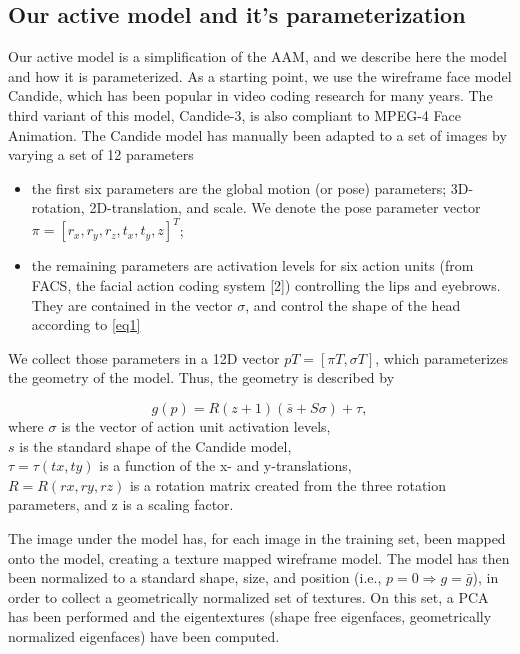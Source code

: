 \documentclass[12pt]{spieman}
\begin{document}
\begin{spacing}{2}   

\section{Our active model and it’s parameterization}
\label{sect:intro}  %
Our active model is a simplification of the AAM, and we describe here the model and how it is parameterized. As a starting point, we use the wireframe face model Candide, which has been popular in video coding research for many years. The third variant of this model, Candide-3, is also compliant to MPEG-4 Face Animation. The Candide model has manually been adapted to a set of images by varying a set of 12 parameters
\begin{itemize}
    \sloppy
    \item the first six parameters are the global motion (or pose) parameters; 3D-rotation, 2D-translation, and scale. We denote the pose parameter vector $\pi = [r_x ,r_y ,r_z ,t_x ,t_y ,z]^T$;
    \sloppy
    \item the remaining parameters are activation levels for six action units (from FACS, the facial action coding system [2]) controlling the lips and eyebrows. They are contained in the vector $\sigma$, and control the shape of the head according to \eqref{eq1}
\end{itemize}

We collect those parameters in a 12D vector $pT = [\pi T, \sigma T]$, which parameterizes the geometry of the model. Thus, the geometry is described by

\begin{equation}
    g(p)= R(z + 1)(\bar{s}+ S\sigma)+ \tau, 
    \label{eq1}
\end{equation}
where $\sigma$ is the vector of action unit activation levels, \\
$s$ is the standard shape of the Candide model, \\
$\tau = \tau(tx,ty)$ is a function of the x- and y-translations, \\
$R = R(rx ,ry ,rz)$ is a rotation matrix created from the three rotation parameters, and z is a scaling factor.

The image under the model has, for each image in the training set, been mapped onto the model, creating a texture mapped wireframe model. The model has then been normalized to a standard shape, size, and position (i.e., $p = 0 \Rightarrow{} g = \bar{g}$), in order to collect a geometrically normalized set of textures. On this set, a PCA has been performed and the eigentextures (shape free eigenfaces, geometrically normalized eigenfaces) have been computed. 


\end{spacing}
\end{document}
